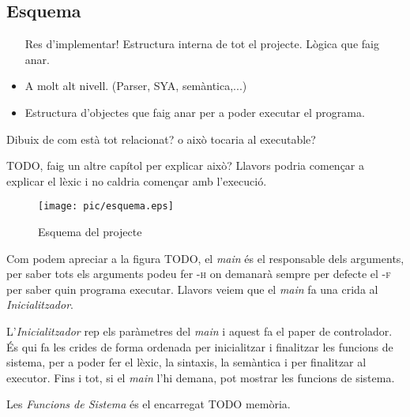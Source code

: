 \subsection{Esquema}
{\color{blue}
\begin{itemize}
    \item[Res d'implementar!] Estructura interna de tot el projecte. Lògica que faig anar.
    \item A molt alt nivell. (Parser, SYA, semàntica,...)
    \item Estructura d'objectes que faig anar per a poder executar el programa.
\end{itemize}
Dibuix de com està tot relacionat? o això tocaria al executable?
}



{\color{blue}
TODO, faig un altre capítol per explicar això?
Llavors podria començar a explicar el lèxic i no caldria començar amb l'execució.
}
\begin{figure}[H]
    \centering
    \texttt{[image: pic/esquema.eps]}
    \caption{Esquema del projecte}
    \label{fig:esquema}
\end{figure}

Com podem apreciar a la figura TODO,
el \textit{main} és el responsable dels arguments,
per saber tots els arguments podeu fer \textsc{-h}
on demanarà sempre per defecte el \textsc{-f} per saber quin programa executar.
Llavors veiem que el \textit{main} fa una crida al \textit{Inicialitzador}.

L'\textit{Inicialitzador} rep els paràmetres del \textit{main}
i aquest fa el paper de controlador.
És qui fa les crides de forma ordenada per inicialitzar i finalitzar les funcions de sistema,
per a poder fer el lèxic, la sintaxis, la semàntica i per finalitzar al executor.
Fins i tot, si el \textit{main} l'hi demana, pot mostrar les funcions de sistema.

Les \textit{Funcions de Sistema} és el encarregat TODO memòria.

